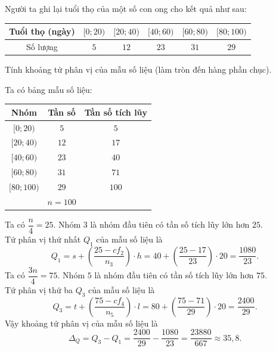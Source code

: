 \begin{ex}%
	Người ta ghi lại tuổi thọ của một số con ong cho kết quả như sau:
	\begin{center}
		\begin{tabular}{|c|c|c|c|c|c|}
			\hline Tuổi thọ (ngày) & {$[0 ; 20)$} & {$[20 ; 40)$} & {$[40 ; 60)$} & {$[60 ; 80)$} & {$[80 ; 100)$} \\
			\hline Số lượng & $5$ & $12$ & $23$ & $31$ & $29$ \\
			\hline
		\end{tabular}
	\end{center}
	Tính khoảng tứ phân vị của mẫu số liệu (làm tròn đến hàng phần chục).
	\loigiai
	{ Ta có bảng mẫu số liệu:
		\begin{center}
			\begin{tabular}{|c|c|c|}
				\hline Nhóm & Tần số & Tần số tích lũy \\
				\hline$[0 ; 20)$ & $5$ & $5$ \\
				\hline$[20 ; 40)$ & $12$ & $17$ \\
				\hline$[40 ; 60)$ & $23$ & $40$ \\
				\hline$[60 ; 80)$ & $31$ & $71$ \\
				\hline$[80 ; 100)$ & $29$ & $100$ \\
				\hline & $n=100$ & \\
				\hline
			\end{tabular}
		\end{center}
		Ta có $\dfrac{n}{4}=25$. Nhóm $3$ là nhóm đầu tiên có tần số tích lũy lớn hơn $25$.\\
		Tứ phân vị thứ nhất $Q_1$ của mẫu số liệu là
		$$
		Q_1=s+\left(\dfrac{25-c f_2}{n_3}\right) \cdot h=40+\left(\dfrac{25-17}{23}\right) \cdot 20=\dfrac{1080}{23}.
		$$
		Ta có $\dfrac{3 n}{4}=75$. Nhóm $5$ là nhóm đầu tiên có tần số tích lũy lớn hơn $75$.\\
		Tứ phân vị thứ ba $Q_3$ của mẫu số liệu là
		$$
		Q_3=t+\left(\dfrac{75-c f_4}{n_5}\right) \cdot l=80+\left(\dfrac{75-71}{29}\right) \cdot 20=\dfrac{2400}{29}.
		$$
		Vậy khoảng tứ phân vị của mẫu số liệu là
		$$
		\Delta_Q=Q_3-Q_1=\dfrac{2400}{29}-\dfrac{1080}{23}=\dfrac{23880}{667} \approx 35{,}8.
		$$
	}
\end{ex}

